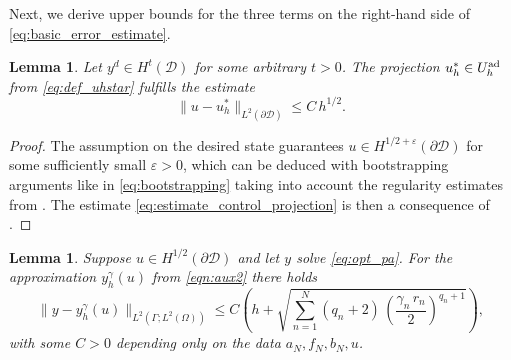 \documentclass[a4paper,10pt]{article}
\newcommand{\cD}{{\mathcal{D}}}
\newtheorem{lemma}[theorem]{Lemma}
\numberwithin{theorem}{section}
\begin{document}
Next, we derive upper bounds for the three terms on the right-hand side of \eqref{eq:basic_error_estimate}.
\begin{lemma}\label{lem:projection_estimate}
	Let $y^d\in H^t(\cD)$ for some arbitrary $t>0$. The projection $u_h^*\in U_h^{\textup{ad}}$ from \eqref{eq:def_uhstar} fulfills the estimate
	\begin{equation}\label{eq:estimate_control_projection}
		\|u-u_h^*\|_{L^2(\partial\cD)} \le C \,  h^{1/2}.
                  \end{equation}
\end{lemma}
\begin{proof}
  The assumption on the desired state guarantees $u\in H^{1/2+\varepsilon}(\partial\cD)$ for some sufficiently small $\varepsilon>0$, which can be deduced with bootstrapping arguments like in \eqref{eq:bootstrapping} taking into account the regularity estimates from \cite[Corollary 5.3]{TApel_MMateos_JPfefferer_ARosch_2015}. The estimate \eqref{eq:estimate_control_projection} is then a consequence of \cite[Lemma 5.6]{TApel_MMateos_JPfefferer_ARosch_2018}.
\end{proof}
\begin{lemma}\label{lem:FE_error_state_eq}
  Suppose $u\in H^{1/2}(\partial\cD)$ and let $y$ solve \eqref{eq:opt_pa}. For the approximation $y_h^\gamma(u)$ from \eqref{eqn:aux2} there holds
  \begin{equation*}
    \|y-y_h^\gamma(u)\|_{L^2(\Gamma; L^2(\Omega))} 
    \le C\left(
      h 
      + \sqrt{\sum_{n=1}^N(q_n+2)\,\left(\frac{\gamma_n\,r_n}{2}\right)^{q_n+1}}
    \right),
  \end{equation*}
  with some $C>0$ depending only on the data $a_N, f_N, b_N, u$.
\end{lemma}
\end{document}
